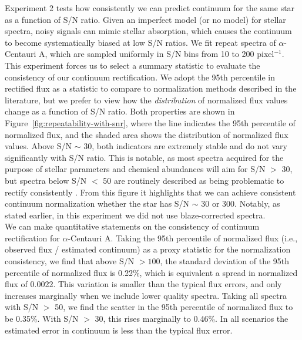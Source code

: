 \documentclass[modern,linenumbers]{aastex631}
\begin{document}
Experiment 2 tests how consistently we can predict continuum for the same star as a function of S/N ratio. Given an imperfect model (or no model) for stellar spectra, noisy signals can mimic stellar absorption, which causes the continuum to become systematically biased at low S/N ratios. We fit repeat spectra of $\alpha$-Centauri A, which are sampled uniformly in S/N bins from 10 to 200 pixel$^{-1}$. This experiment forces us to select a summary statistic to evaluate the consistency of our continuum rectification. We adopt the 95th percentile in rectified flux as a statistic to compare to normalization methods described in the literature, but we prefer to view how the \emph{distribution} of normalized flux values change as a function of S/N ratio. Both properties are shown in Figure~\ref{fig:repeatability-with-snr}, where the line indicates the 95th percentile of normalized flux, and the shaded area shows the distribution of normalized flux values. Above S/N $\sim$ 30, both indicators are extremely stable and do not vary significantly with S/N ratio. This is notable, as most spectra acquired for the purpose of stellar parameters and chemical abundances will aim for S/N $>$ 30, but spectra below S/N $<$ 50 are routinely described as being problematic to rectify consistently \citep{Cretignier:2020}. From this figure it highlights that we can achieve consistent continuum normalization whether the star has S/N $\sim$ 30 or 300. Notably, as stated earlier, in this experiment we did not use blaze-corrected spectra.\\%

We can make quantitative statements on the consistency of continuum rectification for $\alpha$-Centauri A. Taking the 95th percentile of normalized flux (i.e., observed flux / estimated continuum) as a proxy statistic for the normalization consistency, we find that above S/N $> 100$, the standard deviation of the 95th percentile of normalized flux is 0.22\%, which is equivalent a spread in normalized flux of 0.0022. This variation is smaller than the typical flux errors, and only increases marginally when we include lower quality spectra. Taking all spectra with S/N $>$ 50, we find the scatter in the 95th percentile of normalized flux to be 0.35\%. With S/N $>$ 30, this rises marginally to 0.46\%. In all scenarios the estimated error in continuum is less than the typical flux error.\\
\end{document}
